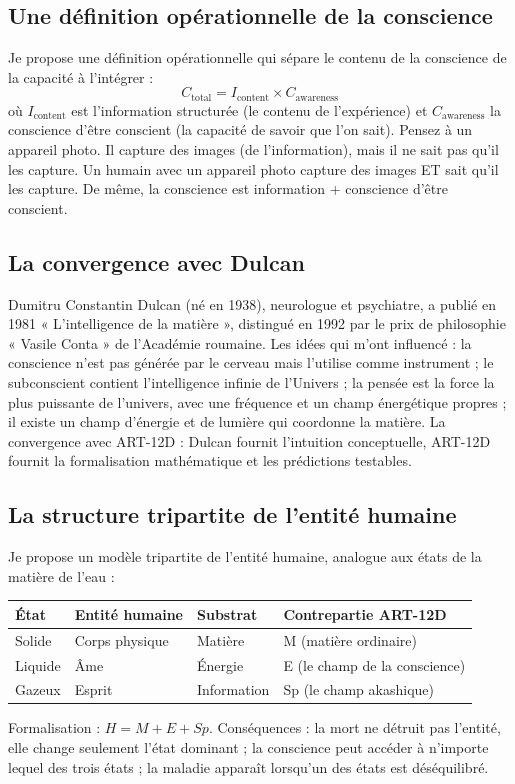 \documentclass[11pt,a4paper]{article}
\begin{document}
\subsection{Une définition opérationnelle de la conscience}
Je propose une définition opérationnelle qui sépare le contenu de la conscience de la capacité à l'intégrer :
\begin{equation}
C_{\text{total}} = I_{\text{content}} \times C_{\text{awareness}}
\end{equation}
où $I_{\text{content}}$ est l'information structurée (le contenu de l'expérience) et $C_{\text{awareness}}$ la conscience d'être conscient (la capacité de savoir que l'on sait). Pensez à un appareil photo. Il capture des images (de l'information), mais il ne sait pas qu'il les capture. Un humain avec un appareil photo capture des images ET sait qu'il les capture. De même, la conscience est information + conscience d'être conscient.

\subsection{La convergence avec Dulcan}
Dumitru Constantin Dulcan (né en 1938), neurologue et psychiatre, a publié en 1981 « L'intelligence de la matière », distingué en 1992 par le prix de philosophie « Vasile Conta » de l'Académie roumaine. Les idées qui m'ont influencé : la conscience n'est pas générée par le cerveau mais l'utilise comme instrument ; le subconscient contient l'intelligence infinie de l'Univers ; la pensée est la force la plus puissante de l'univers, avec une fréquence et un champ énergétique propres ; il existe un champ d'énergie et de lumière qui coordonne la matière. La convergence avec ART-12D : Dulcan fournit l'intuition conceptuelle, ART-12D fournit la formalisation mathématique et les prédictions testables.

\subsection{La structure tripartite de l'entité humaine}
Je propose un modèle tripartite de l'entité humaine, analogue aux états de la matière de l'eau :
\begin{table}[H]
\centering
\begin{tabular}{@{}llll@{}}
\toprule
\textbf{État} & \textbf{Entité humaine} & \textbf{Substrat} & \textbf{Contrepartie ART-12D} \\ \midrule
Solide & Corps physique & Matière & M (matière ordinaire) \\
Liquide & Âme & Énergie & E (le champ de la conscience) \\
Gazeux & Esprit & Information & Sp (le champ akashique) \\ \bottomrule
\end{tabular}
\end{table}
Formalisation : $H = M + E + Sp$. Conséquences : la mort ne détruit pas l'entité, elle change seulement l'état dominant ; la conscience peut accéder à n'importe lequel des trois états ; la maladie apparaît lorsqu'un des états est déséquilibré.
\end{document}
